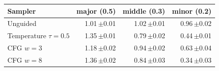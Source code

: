 \begin{tabular}{lrrr}\toprule Sampler & major (0.5) & middle (0.3) & minor (0.2) \\\midrule
Unguided & 1.01\,{\tiny$\pm$0.01} & 1.02\,{\tiny$\pm$0.01} & 0.96\,{\tiny$\pm$0.02} \\
Temperature $\tau=0.5$ & 1.35\,{\tiny$\pm$0.01} & 0.79\,{\tiny$\pm$0.02} & 0.44\,{\tiny$\pm$0.01} \\
CFG $w=3$ & 1.18\,{\tiny$\pm$0.02} & 0.94\,{\tiny$\pm$0.02} & 0.63\,{\tiny$\pm$0.04} \\
CFG $w=8$ & 1.36\,{\tiny$\pm$0.02} & 0.84\,{\tiny$\pm$0.03} & 0.34\,{\tiny$\pm$0.03} \\
\bottomrule\end{tabular}

